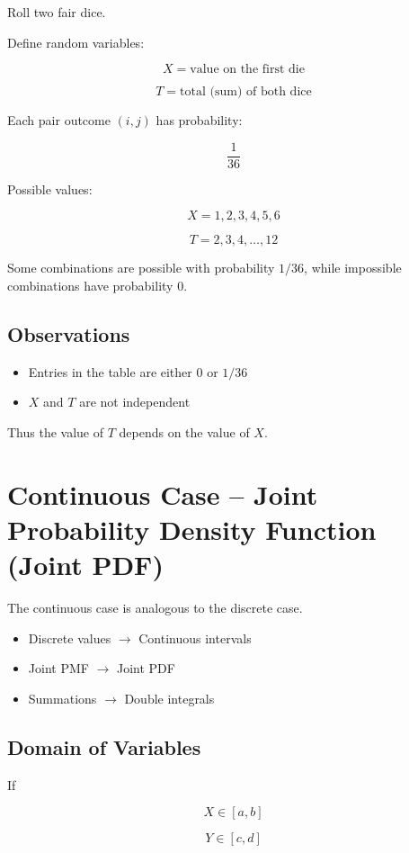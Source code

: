 \documentclass[12pt]{article}
\begin{document}
Roll two fair dice.

Define random variables:

\[
X = \text{value on the first die}
\]

\[
T = \text{total (sum) of both dice}
\]

Each pair outcome \((i,j)\) has probability:

\[
\frac{1}{36}
\]

Possible values:

\[
X = 1,2,3,4,5,6
\]

\[
T = 2,3,4,\dots,12
\]

Some combinations are possible with probability \(1/36\), while impossible combinations have probability \(0\).

\subsection*{Observations}

\begin{itemize}
\item Entries in the table are either \(0\) or \(1/36\)
\item \(X\) and \(T\) are not independent
\end{itemize}

Thus the value of \(T\) depends on the value of \(X\).

\section{Continuous Case -- Joint Probability Density Function (Joint PDF)}

The continuous case is analogous to the discrete case.

\begin{itemize}
\item Discrete values $\rightarrow$ Continuous intervals
\item Joint PMF $\rightarrow$ Joint PDF
\item Summations $\rightarrow$ Double integrals
\end{itemize}

\subsection*{Domain of Variables}

If

\[
X \in [a,b]
\]

\[
Y \in [c,d]
\]
\end{document}
